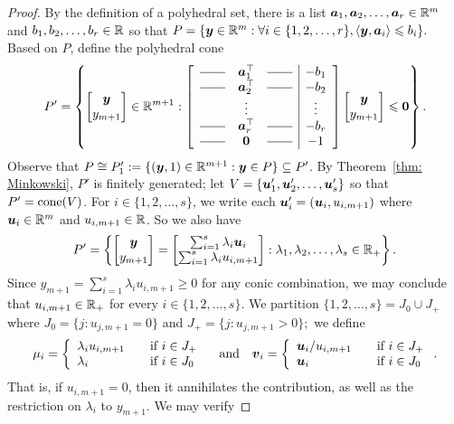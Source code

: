 \begin{proof}
By the definition of a polyhedral set, there is a list ${\boldsymbol a}_1, {\boldsymbol a}_2, \dots, {\boldsymbol a}_r\in\mathbb R^m$ and $b_1, b_2, \dots, b_r\in\mathbb R$ so that $ P = \{ {\boldsymbol y}\in\mathbb R^m:  \forall i\in\{1,2,\dots, r\}, \left\langle{\boldsymbol y}, {\boldsymbol a}_i\right\rangle\leqslant b_i \}.$
Based on $P$, define the polyhedral cone 
\[ P' = \left\{ \bmat{\bmy\\ y_{m+1}}\in\rr^{m+1} : \left[\begin{array}{rcl |c} 
\rule[.5ex]{2em}{.4pt} & \bma_1^\top & \rule[.5ex]{2em}{.4pt} & - b_1 \\
\rule[.5ex]{2em}{.4pt} & \bma_2^\top & \rule[.5ex]{2em}{.4pt}  & - b_2 \\
 & \vdots &  & \vdots \\
\rule[.5ex]{2em}{.4pt} & \bma_r^\top & \rule[.5ex]{2em}{.4pt}  & - b_r\\
\rule[.5ex]{2em}{.4pt} & \bm0 & \rule[.5ex]{2em}{.4pt} & -1
\end{array}\right]  
\bmat{ \bmy \\ y_{m+1} } \leq \bm0
\right\}. \]
Observe that $P\cong P_1' := \{({\boldsymbol y},1)\in\mathbb R^{m+1}: {\boldsymbol y}\in P\}\subseteq P'$. By Theorem~\ref{thm: Minkowski}, $P'$ is finitely generated; let $V = \{{\boldsymbol u}_1', {\boldsymbol u}_2', \dots, {\boldsymbol u}_s'\}$ so that $P' = \operatorname{cone}(V)$. For $i\in\{1,2,\dots, s\}$, we write each ${\boldsymbol u}_i' = ({\boldsymbol u}_i, u_{i, m+1})$ where ${\boldsymbol u}_i\in\mathbb R^m$ and $u_{i, m+1}\in\mathbb R$. So we also have 
 \[ P' = \left\{ \begin{bmatrix} {\boldsymbol y}\\ y_{m+1} \end{bmatrix} = \begin{bmatrix}  \sum_{i=1}^s \lambda_i {\boldsymbol u}_i\\ 
 \sum_{i=1}^s \lambda_i u_{i, m+1}  \end{bmatrix} :  \lambda_1, \lambda_2, \dots, \lambda_s\in\mathbb R_+ \right\}. \]
Since $y_{m+1} = \sum_{i=1}^s \lambda_i u_{i, m+1}\geq 0$ for any conic combination, we may conclude that $u_{i, m+1}\in\mathbb R_+$ for every $i\in\{1,2,\dots, s\}$. We partition $\{1,2,\dots, s\} = J_0 \cup J_+$ where $J_0 = \{j: u_{j, m+1} = 0\}$ and $J_+ = \{j: u_{j, m+1} > 0\};$ we define \
\[\mu_i =\left\{\begin{array}{ll}
\lambda_iu_{i, m+1} & \quad\text{if } i \in J_+ \\ 
\lambda_i & \quad\text{if } i \in J_0
\end{array}\right. 
\quad\text{and}\quad 
{\boldsymbol v}_i =\left\{\begin{array}{ll}
{\boldsymbol u}_i/u_{i, m+1} & \quad\text{if } i \in J_+ \\ 
{\boldsymbol u}_i & \quad\text{if } i \in J_0
\end{array}\right..
\] 
That is, if $u_{i, m+1}= 0$, then it annihilates the contribution, as well as the restriction on $\lambda_i$ to $y_{m+1}$. We may verify 

\end{proof}
